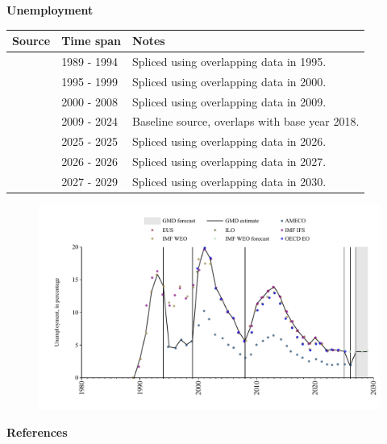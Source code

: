 \documentclass[12pt,a4paper,landscape]{article}
\begin{document}
\begin{adjustbox}{max totalsize={\paperwidth}{\paperheight},center}
\begin{minipage}[t][\textheight][t]{\textwidth}
\vspace*{0.5cm}
{}
\begin{center}
{\Large\bfseries Unemployment}
\end{center}
\vspace{0.5cm}
\begin{table}[H]
\centering
\small
\begin{tabular}{|l|l|l|}
\hline
\textbf{Source} & \textbf{Time span} & \textbf{Notes} \\
\hline
\rowcolor{white}\cite{IMF_WEO}& 1989 - 1994 &Spliced using overlapping data in 1995. \\
\rowcolor{lightgray}\cite{AMECO}& 1995 - 1999 &Spliced using overlapping data in 2000. \\
\rowcolor{white}\cite{OECD_EO}& 2000 - 2008 &Spliced using overlapping data in 2009. \\
\rowcolor{lightgray}\cite{EUS}& 2009 - 2024 &Baseline source, overlaps with base year 2018. \\
\rowcolor{white}\cite{OECD_EO}& 2025 - 2025 &Spliced using overlapping data in 2026. \\
\rowcolor{lightgray}\cite{AMECO}& 2026 - 2026 &Spliced using overlapping data in 2027. \\
\rowcolor{white}\cite{IMF_WEO_forecast}& 2027 - 2029 &Spliced using overlapping data in 2030. \\
\hline
\end{tabular}
\end{table}
\begin{figure}[H]
\centering
\includegraphics[width=\textwidth,height=0.6\textheight,keepaspectratio]{graphs/BGR_unemp.pdf}
\end{figure}
\end{minipage}
\end{adjustbox}
{}
\begin{center}
{\Large\bfseries References}
\end{center}
\small


\end{document}
